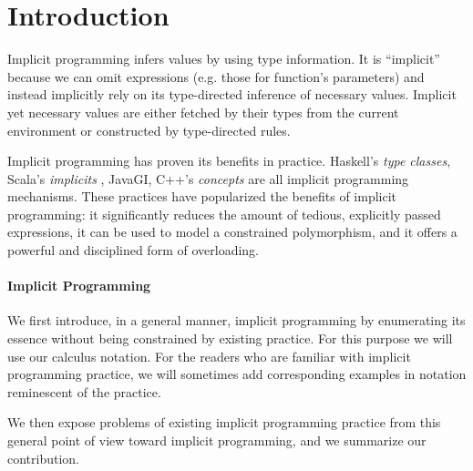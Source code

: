 \newcommand{\Meta}[1]{{\it #1\/}}
\newcommand{\m}[1]{\ensuremath{#1}}

\newcommand{\qlam}[2]{\m{\lambda\{#1\}.#2}}
\newcommand{\qask}[1]{\m{\Meta{?}#1}}
\newcommand{\qapp}[2]{\m{(#1)\;\texttt{with}\;#2}}
\newcommand{\qlet}[2]{\texttt{implicit}\;#1\;\texttt{in}\;#2}
\newcommand{\qLam}[2]{\m{\Lambda#1.#2}} 
  
\newcommand{\ty}[1]{\Meta{#1}}
\newcommand{\tyInt}{\Meta{int}}
\newcommand{\tyBool}{\Meta{bool}}
\newcommand{\rulety}[2]{\m{\{#1\}\!\Rightarrow\!#2}}

\section{Introduction}
\label{sec:intro}


Implicit programming infers values by using type information. It is
``implicit'' because we can omit expressions (e.g. those for function's
parameters) and instead implicitly rely on its type-directed inference
of necessary values. 
Implicit yet necessary values are either fetched by their types from
the current environment or constructed by type-directed rules. 

Implicit programming has proven its benefits in practice. 
Haskell's \emph{type classes}, Scala's \emph{implicits} , JavaGI, C++'s
\emph{concepts} are all implicit programming mechanisms. These
practices have popularized the benefits of implicit programming: it
significantly reduces the amount of tedious, explicitly passed
expressions, it can be used to model a {constrained polymorphism}, and
it offers a powerful and disciplined form of {overloading}. 

\paragraph{Implicit Programming}
We first introduce, in a general manner, implicit programming by
enumerating its essence without being constrained by existing
practice. For this purpose we will use our calculus notation. For the
readers who are familiar with implicit programming practice, we will
sometimes add corresponding examples in notation reminescent of the
practice.

We then expose problems of existing implicit programming practice 
from this general point of view toward implicit programming, and we 
summarize our contribution. 

